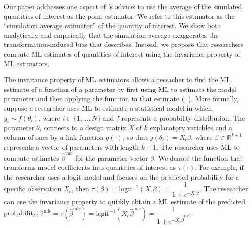 \documentclass[11pt]{article}
\begin{document}


Our paper addresses one aspect of \cite{KingTomzWittenberg2000}'s advice: to use the average of the simulated quantities of interest as the point estimator. We refer to this estimator as the ``simulation average estimator'' of the quantity of interest. We show both analytically and empirically that the simulation average exaggerates the transformation-induced bias that \cite{Rainey2017} describes. Instead, we propose that researchers compute ML estimates of quantities of interest using the invariance property of ML estimators.


The invariance property of ML estimators allows a reseacher to find the ML estimate of a function of a parameter by first using ML to estimate the model parameter and then applying the function to that estimate (\citealt[pp.\@ 75--76]{King1989}; \citealt[pp.\@ 320--321]{CasellaBerger2002}). More formally, suppose a researcher uses ML to estimate a statistical model in which $y_i \sim f(\theta_i)$, where $i \in \{1,\ldots, N\}$ and $f$ represents a probability distribution. The parameter $\theta_i$ connects to a design matrix $X$ of $k$ explanatory variables and a column of ones by a link function $g(\cdot)$, so that $g(\theta_i) = X_i\beta$, where $\beta \in \mathbb{R}^{k+1}$ represents a vector of parameters with length $k + 1$. The researcher uses ML to compute estimates $\hat{\beta}^{\text{mle}}$ for the parameter vector $\beta$. We denote the function that transforms model coefficients into quantities of interest as $\tau(\cdot)$. For example, if the researcher uses a logit model and focuses on the predicted probability for a specific observation $X_c$, then $\tau(\beta) = \text{logit}^{-1}( X_c \beta) = \dfrac{1}{1 + e^{-X_c\beta}}$. The researcher can use the invariance property to quickly obtain a ML estimate of the predicted probability: $\hat{\tau}^{\text{mle}} = \tau \left( \hat{\beta}^{\text{mle}}\right) = \text{logit}^{-1} \left( X_c \hat{\beta}^{\text{mle}} \right) = \dfrac{1}{1 + e^{-X_c \hat{\beta}^{\text{mle}}}}$.
\end{document}
